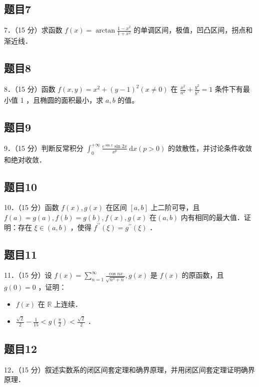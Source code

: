 \documentclass{article}
\begin{document}
\subsection{题目7}
7．（15 分）求函数 \(f(x)=\arctan \frac{1-x^{2}}{1+x^{2}}\) 的单调区间，极值，凹凸区间，拐点和渐近线．

\subsection{题目8}
8．（15 分）函数 \(f(x, y)=x^{2}+(y-1)^{2}(x \neq 0)\) 在 \(\frac{x^{2}}{a^{2}}+\frac{y^{2}}{b^{2}}=1\) 条件下有最小值 1 ，且椭圆的面积最小，求 \(a, b\) 的值。

\subsection{题目9}
9．（15 分）判断反常积分 \(\int_{0}^{+\infty} \frac{e^{\sin x} \sin 2 x}{x^{p}} \mathrm{~d} x(p>0)\) 的敛散性，并讨论条件收敛和绝对收敛．

\subsection{题目10}
10．（15 分）函数 \(f(x), g(x)\) 在区间 \([a, b]\) 上二阶可导，且 \(f(a)=g(a), f(b)=g(b), f(x), g(x)\) 在\((a, b)\) 内有相同的最大值．证明：存在 \(\xi \in(a, b)\) ，使得 \(f^{\prime \prime}(\xi)=g^{\prime \prime}(\xi)\) ．

\subsection{题目11}
11．（15 分）设 \(f(x)=\sum_{n=1}^{\infty} \frac{\cos n x}{\sqrt{n^{3}+n}}, g(x)\) 是 \(f(x)\) 的原函数，且 \(g(0)=0\) ，证明：

\begin{itemize}
  \item[（1）] \(f(x)\) 在 \(\mathbb{R}\) 上连续．
  \item[（2）] \(\frac{\sqrt{2}}{2}-\frac{1}{15}<g\left(\frac{\pi}{2}\right)<\frac{\sqrt{2}}{2}\) ．
\end{itemize}

\subsection{题目12}
12．（15 分）叙述实数系的闭区间套定理和确界原理，并用闭区间套定理证明确界原理．
\end{document}
